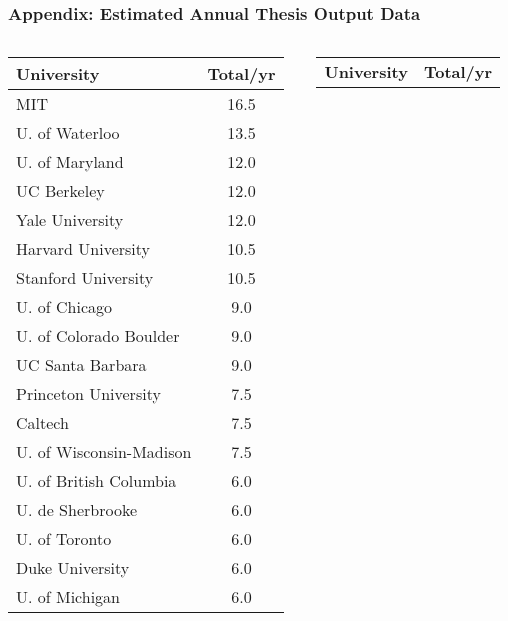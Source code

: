 \documentclass[aspectratio=169]{beamer}
\begin{document}
\begin{frame}[fragile]
    \frametitle{Appendix: Estimated Annual Thesis Output Data}
    \vspace{-2mm}
    \footnotesize 
    \begin{columns}[T]
        \begin{column}{0.5\textwidth}
            \begin{tabularx}{\linewidth}{lS[table-format=2.1]}
                \toprule
                \textbf{University} & {\textbf{Total/yr}} \\
                \midrule
                MIT & 16.5 \\
                U. of Waterloo & 13.5 \\
                U. of Maryland & 12.0 \\
                UC Berkeley & 12.0 \\
                Yale University & 12.0 \\
                Harvard University & 10.5 \\
                Stanford University & 10.5 \\
                U. of Chicago & 9.0 \\
                U. of Colorado Boulder & 9.0 \\
                UC Santa Barbara & 9.0 \\
                Princeton University & 7.5 \\
                Caltech & 7.5 \\
                U. of Wisconsin-Madison & 7.5 \\
                U. of British Columbia & 6.0 \\
                U. de Sherbrooke & 6.0 \\
                U. of Toronto & 6.0 \\
                Duke University & 6.0 \\
                U. of Michigan & 6.0 \\
                \bottomrule
            \end{tabularx}
        \end{column}
        \begin{column}{0.5\textwidth}
            \begin{tabularx}{\linewidth}{lS[table-format=1.1]}
                \toprule
                \textbf{University} & {\textbf{Total/yr}} \\

\end{tabularx}
\end{column}
\end{columns}
\end{frame}
\end{document}
